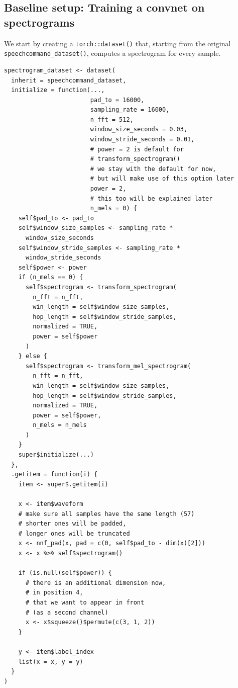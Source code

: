 \documentclass[
  letterpaper,
]{krantz}
\begin{document}
\hypertarget{baseline-setup-training-a-convnet-on-spectrograms}{%
\subsection{Baseline setup: Training a convnet on
spectrograms}\label{baseline-setup-training-a-convnet-on-spectrograms}}

We start by creating a \texttt{torch::dataset()} that, starting from the
original \texttt{speechcommand\_dataset()}, computes a spectrogram for
every sample.

\begin{verbatim}
spectrogram_dataset <- dataset(
  inherit = speechcommand_dataset,
  initialize = function(...,
                        pad_to = 16000,
                        sampling_rate = 16000,
                        n_fft = 512,
                        window_size_seconds = 0.03,
                        window_stride_seconds = 0.01,
                        # power = 2 is default for
                        # transform_spectrogram()
                        # we stay with the default for now,
                        # but will make use of this option later
                        power = 2,
                        # this too will be explained later
                        n_mels = 0) {
    self$pad_to <- pad_to
    self$window_size_samples <- sampling_rate *
      window_size_seconds
    self$window_stride_samples <- sampling_rate *
      window_stride_seconds
    self$power <- power
    if (n_mels == 0) {
      self$spectrogram <- transform_spectrogram(
        n_fft = n_fft,
        win_length = self$window_size_samples,
        hop_length = self$window_stride_samples,
        normalized = TRUE,
        power = self$power
      )
    } else {
      self$spectrogram <- transform_mel_spectrogram(
        n_fft = n_fft,
        win_length = self$window_size_samples,
        hop_length = self$window_stride_samples,
        normalized = TRUE,
        power = self$power,
        n_mels = n_mels
      )
    }
    super$initialize(...)
  },
  .getitem = function(i) {
    item <- super$.getitem(i)

    x <- item$waveform
    # make sure all samples have the same length (57)
    # shorter ones will be padded,
    # longer ones will be truncated
    x <- nnf_pad(x, pad = c(0, self$pad_to - dim(x)[2]))
    x <- x %>% self$spectrogram()

    if (is.null(self$power)) {
      # there is an additional dimension now,
      # in position 4,
      # that we want to appear in front
      # (as a second channel)
      x <- x$squeeze()$permute(c(3, 1, 2))
    }

    y <- item$label_index
    list(x = x, y = y)
  }
)
\end{verbatim}
\end{document}

